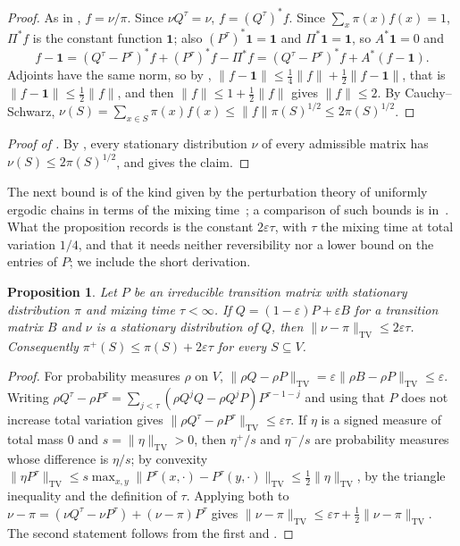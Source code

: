 \documentclass[11pt]{article}
\newtheorem{proposition}[theorem]{Proposition}
\theoremstyle{remark}
\theoremstyle{plain}
\begin{document}
\begin{proof}
As in , $f=\nu/\pi$. Since $\nu Q^\tau=\nu$, $f=(Q^\tau)^*f$. Since $\sum_x\pi(x)f(x)=1$, $\Pi^*f$ is the constant
function $\mathbf1$; also $(P^\tau)^*\mathbf1=\mathbf1$ and $\Pi^*\mathbf1=\mathbf1$, so $A^*\mathbf1=0$ and
\[
f-\mathbf1=(Q^\tau -P^\tau)^*f+(P^\tau)^*f-\Pi^*f=(Q^\tau -P^\tau)^*f+A^*(f-\mathbf1).
\]
Adjoints have the same norm, so by , $\|f-\mathbf1\|\le\frac14\|f\|+\frac12\|f-\mathbf1\|$, that is
$\|f-\mathbf1\|\le\frac12\|f\|$, and then $\|f\|\le1+\frac12\|f\|$ gives $\|f\|\le2$. By Cauchy--Schwarz,
$\nu(S)=\sum_{x\in S}\pi(x)f(x)\le\|f\|\pi(S)^{1/2}\le2\pi(S)^{1/2}$.
\end{proof}

\begin{proof}[Proof of ]
By , every stationary distribution $\nu$ of every admissible matrix has $\nu(S)\le2\pi(S)^{1/2}$, and
 gives the claim.
\end{proof}

The next bound is of the kind given by the perturbation theory of uniformly ergodic chains in terms of the mixing
time~\cite{Mi}; a comparison of such bounds is in~\cite{CM}. What the proposition records is the constant
$2\varepsilon\tau$, with $\tau$ the mixing time at total variation $1/4$, and that it needs neither reversibility nor a
lower bound on the entries of $P$; we include the short derivation.

\begin{proposition}\label{prop:tv}
Let $P$ be an irreducible transition matrix with stationary distribution $\pi$ and mixing time $\tau<\infty$. If
$Q=(1-\varepsilon)P+\varepsilon B$ for a transition matrix $B$ and $\nu$ is a stationary distribution of $Q$, then
$\|\nu-\pi\|_{\mathrm{TV}}\le2\varepsilon\tau$. Consequently $\pi^+(S)\le\pi(S)+2\varepsilon\tau$ for every
$S\subseteq V$.
\end{proposition}

\begin{proof}
For probability measures $\rho$ on $V$, $\|\rho Q-\rho P\|_{\mathrm{TV}}=\varepsilon\|\rho B-\rho
P\|_{\mathrm{TV}}\le\varepsilon$. Writing $\rho Q^\tau-\rho P^\tau=\sum_{j<\tau}(\rho Q^{j}Q-\rho
Q^{j}P)P^{\tau-1-j}$ and using that $P$ does not increase total variation gives
$\|\rho Q^\tau-\rho P^\tau\|_{\mathrm{TV}}\le\varepsilon\tau$. If $\eta$ is a signed measure of total mass $0$ and
$s=\|\eta\|_{\mathrm{TV}}>0$, then $\eta^+/s$ and $\eta^-/s$ are probability measures whose difference is $\eta/s$; by
convexity $\|\eta P^\tau\|_{\mathrm{TV}}\le s\max_{x,y}\|P^\tau(x,\cdot)-P^\tau(y,\cdot)\|_{\mathrm{TV}}
\le\frac12\|\eta\|_{\mathrm{TV}}$, by the triangle inequality and the definition of $\tau$. Applying both to
$\nu-\pi=(\nu Q^\tau-\nu P^\tau)+(\nu-\pi)P^\tau$ gives
$\|\nu-\pi\|_{\mathrm{TV}}\le\varepsilon\tau+\frac12\|\nu-\pi\|_{\mathrm{TV}}$. The second statement follows from the
first and .
\end{proof}
\end{document}
